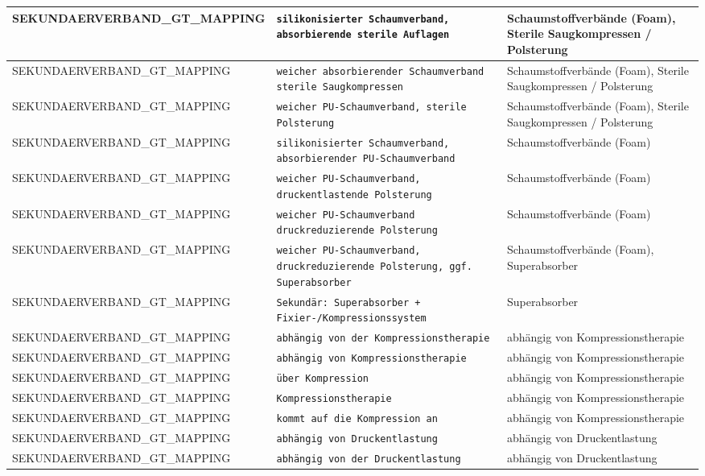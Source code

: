 \begin{longtable}{|p{3.5cm}|p{5cm}|p{6.5cm}|}
SEKUNDAERVERBAND\_GT\_MAPPING & \texttt{silikonisierter Schaumverband, absorbierende sterile Auflagen} & Schaumstoffverbände (Foam), Sterile Saugkompressen / Polsterung \\ \hline
SEKUNDAERVERBAND\_GT\_MAPPING & \texttt{weicher absorbierender Schaumverband sterile Saugkompressen} & Schaumstoffverbände (Foam), Sterile Saugkompressen / Polsterung \\ \hline
SEKUNDAERVERBAND\_GT\_MAPPING & \texttt{weicher PU-Schaumverband, sterile Polsterung} & Schaumstoffverbände (Foam), Sterile Saugkompressen / Polsterung \\ \hline
SEKUNDAERVERBAND\_GT\_MAPPING & \texttt{silikonisierter Schaumverband, absorbierender PU-Schaumverband} & Schaumstoffverbände (Foam) \\ \hline
SEKUNDAERVERBAND\_GT\_MAPPING & \texttt{weicher PU-Schaumverband, druckentlastende Polsterung} & Schaumstoffverbände (Foam) \\ \hline
SEKUNDAERVERBAND\_GT\_MAPPING & \texttt{weicher PU-Schaumverband druckreduzierende Polsterung} & Schaumstoffverbände (Foam) \\ \hline
SEKUNDAERVERBAND\_GT\_MAPPING & \texttt{weicher PU-Schaumverband, druckreduzierende Polsterung, ggf. Superabsorber} & Schaumstoffverbände (Foam), Superabsorber \\ \hline
SEKUNDAERVERBAND\_GT\_MAPPING & \texttt{Sekundär: Superabsorber + Fixier-/Kompressionssystem} & Superabsorber \\ \hline
SEKUNDAERVERBAND\_GT\_MAPPING & \texttt{abhängig von der Kompressionstherapie} & abhängig von Kompressionstherapie \\ \hline
SEKUNDAERVERBAND\_GT\_MAPPING & \texttt{abhängig von Kompressionstherapie} & abhängig von Kompressionstherapie \\ \hline
SEKUNDAERVERBAND\_GT\_MAPPING & \texttt{über Kompression} & abhängig von Kompressionstherapie \\ \hline
SEKUNDAERVERBAND\_GT\_MAPPING & \texttt{Kompressionstherapie} & abhängig von Kompressionstherapie \\ \hline
SEKUNDAERVERBAND\_GT\_MAPPING & \texttt{kommt auf die Kompression an} & abhängig von Kompressionstherapie \\ \hline
SEKUNDAERVERBAND\_GT\_MAPPING & \texttt{abhängig von Druckentlastung} & abhängig von Druckentlastung \\ \hline
SEKUNDAERVERBAND\_GT\_MAPPING & \texttt{abhängig von der Druckentlastung} & abhängig von Druckentlastung \\ \hline

\end{longtable}
